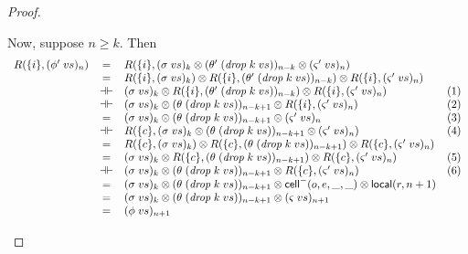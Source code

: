 \begin{proof}
\begin{enumerate}
  Now, suppose $n \geq k$. Then 
  \begin{displaymath}
      \begin{array}{lcll}
        R(\{{i}\}, (\phi'\;vs)_n) 
        & = & R(\{{i}\}, (\sigma\;vs)_k \otimes (\theta'\;(\mathit{drop}\;k\;vs))_{n-k} \otimes (\varsigma'\;vs)_n)
        & \\
        & = & R(\{{i}\}, (\sigma\;vs)_k) \otimes R(\{{i}\}, (\theta'\;(\mathit{drop}\;k\;vs))_{n-k}) \otimes R(\{{i}\}, (\varsigma'\;vs)_n)
        & \\
        & \dashv\vdash & (\sigma\;vs)_k \otimes R(\{{i}\}, (\theta'\;(\mathit{drop}\;k\;vs))_{n-k}) \otimes R(\{{i}\}, (\varsigma'\;vs)_n)
        & (1) \\
        & \dashv\vdash & (\sigma\;vs)_k \otimes (\theta\;(\mathit{drop}\;k\;vs))_{n-k+1} \otimes R(\{{i}\}, (\varsigma'\;vs)_n)
        & (2) \\ 
        & = & (\sigma\;vs)_k \otimes (\theta\;(\mathit{drop}\;k\;vs))_{n-k+1} \otimes (\varsigma'\;vs)_n
        & (3) \\ 
        & \dashv\vdash & R(\{{c}\}, (\sigma\;vs)_k \otimes (\theta\;(\mathit{drop}\;k\;vs))_{n-k+1} \otimes (\varsigma'\;vs)_n)
        & (4) \\ 
        & = & R(\{{c}\}, (\sigma\;vs)_k) \otimes R(\{{c}\}, (\theta\;(\mathit{drop}\;k\;vs))_{n-k+1}) \otimes R(\{{c}\}, (\varsigma'\;vs)_n)
        & \\ 
        & = & (\sigma\;vs)_k \otimes R(\{{c}\}, (\theta\;(\mathit{drop}\;k\;vs))_{n-k+1}) \otimes R(\{{c}\}, (\varsigma'\;vs)_n)
        & (5) \\
        & \dashv\vdash & (\sigma\;vs)_k \otimes (\theta\;(\mathit{drop}\;k\;vs))_{n-k+1} \otimes R(\{{c}\}, (\varsigma'\;vs)_n)
        & (6) \\ 
        & = & (\sigma\;vs)_k \otimes (\theta\;(\mathit{drop}\;k\;vs))_{n-k+1} \otimes \mathsf{cell}^{-}({o}, {e}, {\_}, {\_}) \otimes \mathsf{local}({r}, {n+1})
        & \\ 
        & = & (\sigma\;vs)_k \otimes (\theta\;(\mathit{drop}\;k\;vs))_{n-k+1} \otimes (\varsigma\;vs)_{n+1}
        & \\ 
        & = & (\phi\;vs)_{n+1}
        \end{array}
  \end{displaymath}


\end{enumerate}
\end{proof}
